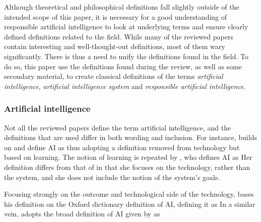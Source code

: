 \label{sec:Definitions}
Although theoretical and philosophical definitions fall slightly outside of the intended scope of this paper, it is necessary for a good understanding of responsible artificial intelligence to look at underlying terms and ensure clearly defined definitions related to the field. While many of the reviewed papers contain interesting and well-thought-out definitions, most of them wary significantly. There is thus a need to unify the definitions found in the field. To do so, this paper use the definitions found during the review, as well as some secondary material, to create classical definitions \parencite[p. 36]{Seppälä_2014} of the terms \textit{artificial intelligence}, \textit{artificial intelligence system} and \textit{responsible artificial intelligence}.


\subsubsection{Artificial intelligence}
\label{sec:definition-ai}
Not all the reviewed papers define the term artificial intelligence, and the definitions that are used differ in both wording and inclusion. For instance, \textcite[p. 258]{Mikalef_2022} builds on \textcite{Mikalef_2021_notreview} and define AI as  thus adopting a definition removed from technology but based on learning. The notion of learning is repeated by \textcite[p. 2]{Dignum_2021}, who defines AI as  Her definition differs from that of \citeauthor{Mikalef_2022} in that she focuses on the technology, rather than the system, and she does not include the notion of the system's goals.

Focusing strongly on the outcome and technological side of the technology, \textcite[p. 130-131]{Brand_2022} bases his definition on the Oxford dictionary definition of AI, defining it as  In a similar vein, \textcite[p. 1]{Havrda_2020} adopts the broad definition of AI given by \textcite{IEEE_vision} as 

